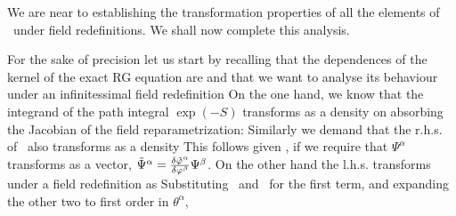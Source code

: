 

We are near to establishing the transformation
properties of all the elements of \wegner\ under field redefinitions.
We shall now complete this analysis. 

For the sake of precision let us start by recalling that the dependences of
the kernel of 
the exact RG equation are
\eqn\dependpsi{
 \Psi=\Psi^\alpha[\phi,t]\ ,
}
and that we want to analyse its behaviour under an infinitessimal field
redefinition
\eqn{}
On the one hand, we know 
that the integrand of the path integral $\exp{(-S)}$
transforms as a density on absorbing the Jacobian of the field
reparametrization:
\eqn{} 
Similarly we demand that  the r.h.s. of \wegner\  also
 transforms as a density \ie
\eqn{}
This follows 
given \density, if we require that $\Psi^\alpha$
transforms as a vector, $\tilde\Psi^\alpha={\delta \tilde\phi^\alpha\over
 \delta \phi^\beta} \Psi^\beta$. On the other hand the l.h.s.
transforms under a field redefinition as
\eqn{}
Substituting \wegner\ and \rhstrans\ 
for the first term, and 
expanding the other two to first order in $\theta^\alpha$, 
\eqn{}
